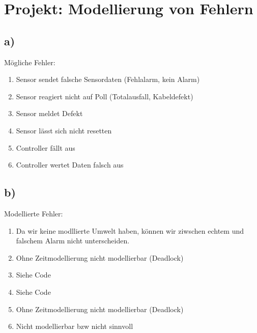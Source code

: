 \documentclass[10pt,a4paper,fleqn]{article}
\begin{document}
  \renewcommand{\labelenumi}{(\alph{enumi})}
  \renewcommand\headrule{\vspace{+2pt}\hrule}
  \newcommand{\solved}{\[\hfill\Box\]}
  \setlength{\headheight}{2.5\baselineskip}
  \pagestyle{fancyplain}

  \rhead{\emph{}\\ \today}

  \section*{Projekt: Modellierung von Fehlern}
  \subsection*{a)}
  Mögliche Fehler:
  \begin{enumerate}[label=\arabic*.]
    \item Sensor sendet falsche Sensordaten (Fehlalarm, kein Alarm)
    \item Sensor reagiert nicht auf Poll (Totalausfall, Kabeldefekt)
    \item Sensor meldet Defekt
    \item Sensor lässt sich nicht resetten
    \item Controller fällt aus
    \item Controller wertet Daten falsch aus
  \end{enumerate}

  \subsection*{b)}
  Modellierte Fehler:
  \begin{enumerate}[label=\arabic*.]
    \item Da wir keine modllierte Umwelt haben, können wir ziwschen echtem und falschem Alarm nicht unterscheiden.
    \item Ohne Zeitmodellierung nicht modellierbar (Deadlock)
    \item Siehe Code
    \item Siehe Code
    \item Ohne Zeitmodellierung nicht modellierbar (Deadlock)
    \item Nicht modellierbar bzw nicht sinnvoll
  \end{enumerate}
\end{document}
